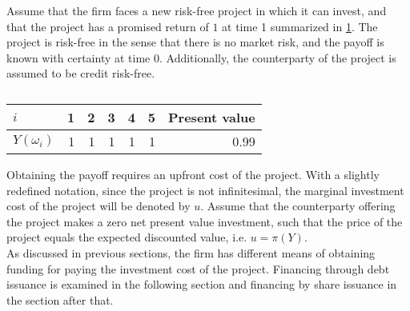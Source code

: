 \documentclass[main.tex]{subfiles}
\begin{document}
    Assume that the firm faces a new risk-free project in which it can invest,
    and that the project has a promised return of $\num{1}$ at time 1 summarized in \cref{tbl:single-period-simple-derivative-payoff}.
    The project is risk-free in the sense that there is no market risk,
    and the payoff is known with certainty at time 0.
    Additionally, the counterparty of the project is assumed to be credit risk-free.
        \begin{table}[H]
            \centering
            \begin{tabular}{l|rrrrr||r}
                $i$ & 1 & 2 & 3 & 4 & 5 & Present value\\
                \hline
                $Y(\omega_{i})$ & 
                    \num{1} & \num{1} & \num{1} & \num{1} & \num{1} & \num{0.99}
            \end{tabular}
            \caption{}
            \label{tbl:single-period-simple-derivative-payoff}
        \end{table}
    Obtaining the payoff requires an upfront cost of the project.
    With a slightly redefined notation, since the project is not infinitesimal,
    the marginal investment cost of the project will be denoted by $u$.
    Assume that the counterparty offering the project makes a zero net present value investment, 
    such that the price of the project equals the expected discounted value, i.e. $u = \pi(Y)$.
    \\
    As discussed in previous sections, the firm has different means of obtaining funding
    for paying the investment cost of the project.
    Financing through debt issuance is examined in the following section 
    and financing by share issuance in the section after that.
\end{document}
